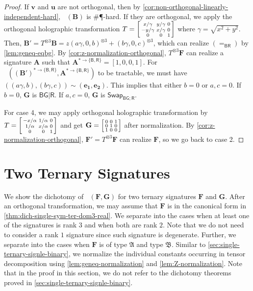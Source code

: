 \documentclass[11pt]{article}
\DeclareMathOperator{\holbs}{Holant^*_2}
\DeclareMathOperator{\holts}{Holant^*_3}
\newcommand{\db}{\mathsf{B}}
\newcommand{\dg}{\mathsf{G}}
\newcommand{\dr}{\mathsf{R}}
\newcommand{\swhelper}[1]{$\mathsf{Swap}_{#1}$\xspace}
\newcommand{\swbg}{\swhelper{\db \dg; \dr}}
\newcommand{\sph}{\#\P-hard\xspace}
\newcommand{\teh}{^{\otimes 3}}
\newcommand{\domres}[1]{
  ^{*\to\{#1\}}
}
\newcommand{\ternarytractgeneq}{$\mathfrak{A}$\xspace}
\newcommand{\ternarytractz}{$\mathfrak{B}$\xspace}
\begin{document}
\begin{proof}
  If $\mathbf{v}$ and $\mathbf{u}$ are not orthogonal, then by \cref{cor:non-orthogonal-linearly-independent-hard}, $\holts(\mathbf{B})$ is \sph.
  If they are orthogonal, we apply the orthogonal holographic transformation $T = \begin{bsmallmatrix}
    x/\gamma & y/\gamma & 0 \\
    -y /\gamma & x /\gamma & 0 \\
    0 & 0 & 1
  \end{bsmallmatrix}$ where $\gamma = \sqrt{x^2 + y^2}$.
  Then, $\mathbf{B}' = T \teh \mathbf{B} = z(a \gamma, 0, b)\teh + (b \gamma, 0, c)\teh$, which can realize $(=_{\db \dr})$ by \cref{lem:geneq-eqbg}.
  By \cref{cor:z-normalization-orthogonal}, $T \teh \mathbf{F}$ can realize a signature $\mathbf{A}$ such that $\mathbf{A}\domres{\db, \dr} = [1, 0, 0, 1]$.
  For $\holbs((\mathbf{B}')\domres{\db, \dr}, \mathbf{A}\domres{\db, \dr})$ to be tractable, we must have $((a \gamma, b), (b \gamma, c)) \sim (\mathbf{e_1}, \mathbf{e_2})$.
  This implies that either $b = 0$ or $a, c = 0$.
  If $b = 0$, $\mathbf{G}$ is $\db \dg | \dr$.
  If $a, c = 0$, $\mathbf{G}$ is \swbg.

  For case 4, we may apply orthogonal holographic transformation by $T = \begin{bsmallmatrix}
    -x/\alpha & 1/\alpha & 0 \\
    1/\alpha & x/\alpha & 0 \\
    0 & 0 & 1
    \end{bsmallmatrix}$ and get $\mathbf{G} = \begin{bsmallmatrix}
    0 & 0 & 1 \\
    0 & 1 & 0 \\
    1 & 0 & 0
  \end{bsmallmatrix}$ after normalization. 
  By \cref{cor:z-normalization-orthogonal}, $\mathbf{F'} = T \teh \mathbf{F}$ can realize $\mathbf{F}$, so we go back to case 2.
\end{proof}
 
\section{Two Ternary Signatures}\label{sec:two-ternary}
We show the dichotomy of $\holts(\mathbf{F}, \mathbf{G})$ for two ternary signatures $\mathbf{F}$ and $\mathbf{G}$.
After an orthogonal transformation, we may assume that $\mathbf{F}$ is in the canonical form in \cref{thm:dich-single-sym-ter-dom3-real}.
We separate into the cases when at least one of the signatures is rank $3$ and when both are rank $2$.
Note that we do not need to consider a rank $1$ signature since such signature is degenerate.
Further, we separate into the cases when $\mathbf{F}$ is of type \ternarytractgeneq and type \ternarytractz.
Similar to \cref{sec:single-ternary-signle-binary}, we normalize the individual constants occurring in tensor decomposition using \cref{lem:geneq-normalization} and \cref{lem:Z-normalization}. 
Note that in the proof in this section, we do not refer to the dichotomy theorems proved in \cref{sec:single-ternary-signle-binary}.
\end{document}
